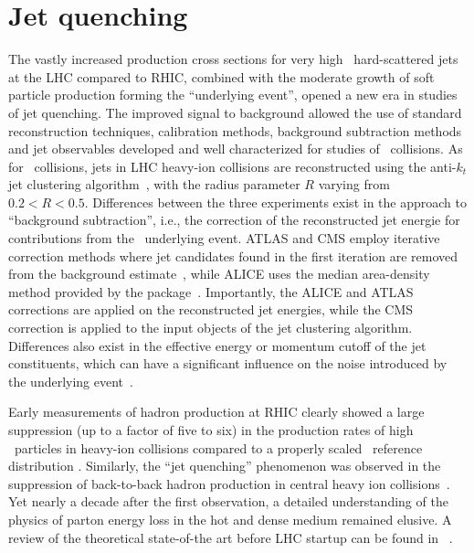 \section{Jet quenching}
\label{jets_intro}

The vastly increased production cross sections for very high \pT\ hard-scattered jets at the LHC
compared to RHIC, combined with the moderate growth of soft particle production forming the ``underlying
event'', opened a new era in studies of jet quenching. The improved signal to background allowed the
use of standard reconstruction techniques, calibration methods, background subtraction methods and
jet observables developed and well characterized for studies of \pp\ collisions.
As for \pp\ collisions, jets in LHC heavy-ion collisions are reconstructed using
the {} anti-$k_t$ jet clustering algorithm~\cite{Cacciari:2008gp}, with the
radius parameter $R$ varying from $0.2 < R  < 0.5$. Differences between the three
experiments exist in the approach to ``background subtraction'', i.e., the correction
of the reconstructed jet energie for contributions from the \PbPb\ underlying event. 
ATLAS and CMS employ iterative correction methods where jet candidates found in
the first iteration are removed from the background estimate~\cite{Kodolova:2007hd,Grau:2008ed},
while ALICE uses the median area-density method provided by the {} package~\cite{Cacciari:2011ma}.
Importantly, the ALICE and ATLAS corrections are applied on the reconstructed jet energies,
while the CMS correction is applied to the input objects of the jet clustering algorithm.
Differences also exist in the effective energy or momentum cutoff of the jet constituents,
which can have a significant influence on the noise introduced by the underlying event~\cite{Abelev:2012ej}.

Early measurements of hadron production at RHIC
clearly showed a large suppression (up to a factor of five to six) in the production rates of
high \pT\ particles in heavy-ion collisions compared to a properly scaled \pp\ reference distribution
\cite{Adcox:2001jp,Adler:2002xw}. Similarly, the ``jet quenching'' phenomenon was observed
in the suppression of back-to-back hadron production
in central heavy ion collisions~\cite{Adcox:2001jp,Adler:2002xw}. Yet nearly a decade after the first observation, a detailed
understanding of the physics of parton energy loss in the hot and dense medium remained
elusive. A review of the theoretical state-of-the art before LHC startup can be
found in ~\cite{Wiedemann:2009sh}.

